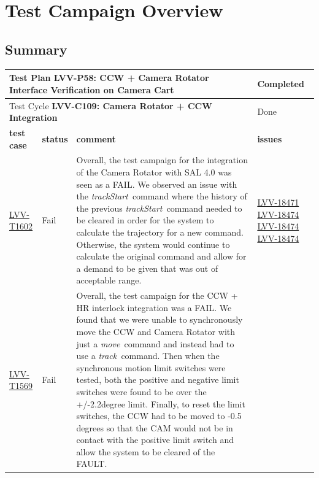 \documentclass[SE,lsstdraft,STR,toc]{lsstdoc}
\begin{document}
\newpage

\section{Test Campaign Overview}
\label{sect:overview}

\subsection{Summary}
\label{sect:summarytable}

\begin{longtable}{p{2cm}p{2.5cm}p{9cm}p{2.5cm}}
\toprule
\multicolumn{3}{l}{ Test Plan {\bf LVV-P58:  CCW + Camera Rotator Interface Verification on Camera Cart
 }} & Completed \\\hline

  \multicolumn{3}{l}{ Test Cycle {\bf LVV-C109:  Camera Rotator + CCW Integration
 }} & Done \\\hline

  {\bf \footnotesize test case} & {\bf \footnotesize status} & {\bf \footnotesize comment} & {\bf \footnotesize issues} \\\toprule

    \href{https://jira.lsstcorp.org/secure/Tests.jspa#/testCase/LVV-T1602}{LVV-T1602}
    & Fail &
    \begin{minipage}[]{9cm}
    \smallskip
     Overall, the test campaign for the integration of the Camera Rotator
with SAL 4.0 was seen as a FAIL. We observed an issue with the
\emph{trackStart~}command where the history of the previous
\emph{trackStart~}command needed to be cleared in order for the system
to calculate the trajectory for a new command. Otherwise, the system
would continue to calculate the original command and allow for a demand
to be given that was out of acceptable range.

    \medskip
    \end{minipage}
    &
          \href{https://jira.lsstcorp.org/browse/LVV-18471}{LVV-18471}
          \href{https://jira.lsstcorp.org/browse/LVV-18474}{LVV-18474}
          \href{https://jira.lsstcorp.org/browse/LVV-18474}{LVV-18474}
          \href{https://jira.lsstcorp.org/browse/LVV-18474}{LVV-18474}
    \\\hline
    \href{https://jira.lsstcorp.org/secure/Tests.jspa#/testCase/LVV-T1569}{LVV-T1569}
    & Fail &
    \begin{minipage}[]{9cm}
    \smallskip
     Overall, the test campaign for the CCW + HR interlock integration was a
FAIL. We found that we were unable to synchronously move the CCW and
Camera Rotator with just a \emph{move~}command and instead had to use a
\emph{track~}command. Then when the synchronous motion limit switches
were tested, both the positive and negative limit switches were found to
be over the +/-2.2degree limit. Finally, to reset the limit switches,
the CCW had to be moved to -0.5 degrees so that the CAM would not be in
contact with the positive limit switch and allow the system to be
cleared of the FAULT.~


\end{minipage}
\end{longtable}
\end{document}
